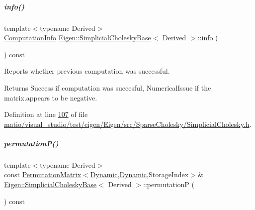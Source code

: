 \mbox{\label{group___sparse_cholesky___module_a3ac877f73aaaff670e6ae7554eb02fc8}} 
\subparagraph{\texorpdfstring{info()}{info()}\hspace{0.1cm}{\footnotesize\ttfamily [2/2]}}
{\footnotesize\ttfamily template$<$typename Derived$>$ \\
\hyperlink{group__enums_ga85fad7b87587764e5cf6b513a9e0ee5e}{Computation\+Info} \hyperlink{group___sparse_cholesky___module_class_eigen_1_1_simplicial_cholesky_base}{Eigen\+::\+Simplicial\+Cholesky\+Base}$<$ Derived $>$\+::info (\begin{DoxyParamCaption}{ }\end{DoxyParamCaption}) const\hspace{0.3cm}{\ttfamily [inline]}}



Reports whether previous computation was successful. 

\begin{DoxyReturn}{Returns}
{\ttfamily Success} if computation was succesful, {\ttfamily Numerical\+Issue} if the matrix.\+appears to be negative. 
\end{DoxyReturn}


Definition at line \hyperlink{matio_2visual__studio_2test_2eigen_2_eigen_2src_2_sparse_cholesky_2_simplicial_cholesky_8h_source_l00107}{107} of file \hyperlink{matio_2visual__studio_2test_2eigen_2_eigen_2src_2_sparse_cholesky_2_simplicial_cholesky_8h_source}{matio/visual\+\_\+studio/test/eigen/\+Eigen/src/\+Sparse\+Cholesky/\+Simplicial\+Cholesky.\+h}.

\mbox{\label{group___sparse_cholesky___module_aff1480e595a21726beaec9a586a94d5a}} 
\subparagraph{\texorpdfstring{permutation\+P()}{permutationP()}\hspace{0.1cm}{\footnotesize\ttfamily [1/2]}}
{\footnotesize\ttfamily template$<$typename Derived$>$ \\
const \hyperlink{group___core___module_class_eigen_1_1_permutation_matrix}{Permutation\+Matrix}$<$\hyperlink{namespace_eigen_ad81fa7195215a0ce30017dfac309f0b2}{Dynamic},\hyperlink{namespace_eigen_ad81fa7195215a0ce30017dfac309f0b2}{Dynamic},Storage\+Index$>$\& \hyperlink{group___sparse_cholesky___module_class_eigen_1_1_simplicial_cholesky_base}{Eigen\+::\+Simplicial\+Cholesky\+Base}$<$ Derived $>$\+::permutationP (\begin{DoxyParamCaption}{ }\end{DoxyParamCaption}) const\hspace{0.3cm}{\ttfamily [inline]}}

